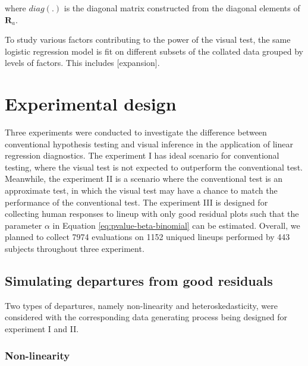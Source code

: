 \documentclass[]{interact}
\theoremstyle{plain}%
\theoremstyle{definition}
\theoremstyle{remark}
\begin{document}
\noindent where \(diag(.)\) is the diagonal matrix constructed from the
diagonal elements of \(\boldsymbol{R}_a\).

To study various factors contributing to the power of the visual test,
the same logistic regression model is fit on different subsets of the
collated data grouped by levels of factors. This includes
{[}expansion{]}.

\hypertarget{experimental-design}{%
\section{Experimental design}\label{experimental-design}}

Three experiments were conducted to investigate the difference between
conventional hypothesis testing and visual inference in the application
of linear regression diagnostics. The experiment I has ideal scenario
for conventional testing, where the visual test is not expected to
outperform the conventional test. Meanwhile, the experiment II is a
scenario where the conventional test is an approximate test, in which
the visual test may have a chance to match the performance of the
conventional test. The experiment III is designed for collecting human
responses to lineup with only good residual plots such that the
parameter \(\alpha\) in Equation \ref{eq:pvalue-beta-binomial} can be
estimated. Overall, we planned to collect 7974 evaluations on 1152
uniqued lineups performed by 443 subjects throughout three experiment.

\hypertarget{simulating-departures-from-good-residuals}{%
\subsection{Simulating departures from good
residuals}\label{simulating-departures-from-good-residuals}}

Two types of departures, namely non-linearity and heteroskedasticity,
were considered with the corresponding data generating process being
designed for experiment I and II.

\hypertarget{non-linearity}{%
\subsubsection{Non-linearity}\label{non-linearity}}
\end{document}

